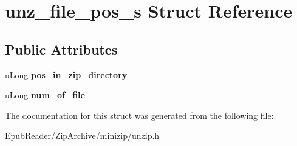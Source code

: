 \hypertarget{structunz__file__pos__s}{\section{unz\-\_\-file\-\_\-pos\-\_\-s Struct Reference}
\label{structunz__file__pos__s}
}
\subsection*{Public Attributes}
\begin{DoxyCompactItemize}
\item 
\hypertarget{structunz__file__pos__s_a87d193346d3825363f899f574a2f3cb2}{u\-Long {\bfseries pos\-\_\-in\-\_\-zip\-\_\-directory}}\label{structunz__file__pos__s_a87d193346d3825363f899f574a2f3cb2}

\item 
\hypertarget{structunz__file__pos__s_a771dc0b7dba811b6174382f87f6800fc}{u\-Long {\bfseries num\-\_\-of\-\_\-file}}\label{structunz__file__pos__s_a771dc0b7dba811b6174382f87f6800fc}

\end{DoxyCompactItemize}


The documentation for this struct was generated from the following file\-:\begin{DoxyCompactItemize}
\item 
Epub\-Reader/\-Zip\-Archive/minizip/unzip.\-h\end{DoxyCompactItemize}
